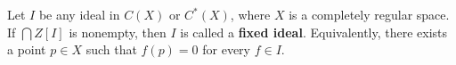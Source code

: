 Let $I$ be any ideal in $C(X)$ or $C^*(X)$, where $X$ is a completely regular space. If $\bigcap Z[I]$ is nonempty, then $I$ is called a \textbf{fixed ideal}. Equivalently, there exists a point $p \in X$ such that $f(p) = 0$ for every $f \in I$.
